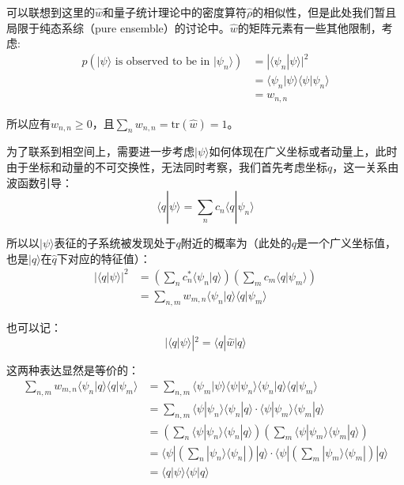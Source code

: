 \documentclass[UTF8]{ctexart}
\begin{document}
\begin{spacing}{2.0}
可以联想到这里的$\hat{w}$和量子统计理论中的密度算符$\hat{\rho}$的相似性，但是此处我们暂且局限于纯态系综（pure ensemble）的讨论中。$\hat{w}$的矩阵元素有一些其他限制，考虑:
\begin{equation}
\begin{aligned}
p(|\psi\rangle \text{ is observed to be in }|\psi_{n}\rangle) &= |\langle \psi_{n}|\psi \rangle|^{2}\\
&= \langle \psi_{n}|\psi\rangle\langle\psi|\psi_{n}\rangle \\
&= w_{n,n}
\end{aligned}
\end{equation}

所以应有$w_{n,n}\geq 0$，且$\sum_{n}w_{n,n}=\text{tr}(\hat{w})=1$。

为了联系到相空间上，需要进一步考虑$|\psi\rangle$如何体现在广义坐标或者动量上，此时由于坐标和动量的不可交换性，无法同时考察，我们首先考虑坐标$q$，这一关系由波函数引导：
\begin{equation}
\langle q|\psi\rangle = \sum_{n} c_{n} \langle q | \psi_{n} \rangle
\end{equation}

所以以$|\psi \rangle$表征的子系统被发现处于$q$附近的概率为（此处的$q$是一个广义坐标值，也是$|q\rangle$在$\hat{q}$下对应的特征值）：
\begin{equation}
\begin{aligned}
|\langle q | \psi \rangle|^{2}&= \left(\sum_{n} c^{*}_{n} \langle  \psi_{n}|q \rangle \right)\left(\sum_{m} c_{m} \langle q | \psi_{m} \rangle \right) \\
&= \sum_{n,m}w_{m,n} \langle  \psi_{n}|q \rangle\langle q | \psi_{m} \rangle
\end{aligned}
\end{equation}

也可以记：
\begin{equation}
|\langle q | \psi \rangle|^{2}=\langle q |\hat{w}| q\rangle
\end{equation}

这两种表达显然是等价的：
\begin{equation}
\begin{aligned}
 \sum_{n,m}w_{m,n} \langle  \psi_{n}|q \rangle\langle q | \psi_{m} \rangle &=  \sum_{n,m}\langle \psi_{m}|\psi\rangle\langle \psi | \psi_{n}\rangle \langle  \psi_{n}|q \rangle\langle q | \psi_{m} \rangle \\ 
&= \sum_{n,m} \langle \psi | \psi_{n}\rangle \langle  \psi_{n}|q \rangle \cdot \langle \psi | \psi_{m}\rangle \langle  \psi_{m}|q \rangle \\
&=\left(\sum_{n}\langle \psi | \psi_{n}\rangle \langle  \psi_{n}|q \rangle \right)\left(\sum_{m}\langle \psi | \psi_{m}\rangle \langle  \psi_{m}|q \rangle \right) \\
&= \langle \psi | \left(\sum_{n} | \psi_{n}\rangle \langle  \psi_{n}| \right)|q\rangle\cdot \langle \psi | \left(\sum_{m} | \psi_{m}\rangle \langle  \psi_{m}| \right)|q\rangle \\
&= \langle q|\psi\rangle \langle \psi|q\rangle
\end{aligned}
\end{equation}


\end{spacing}
\end{document}
